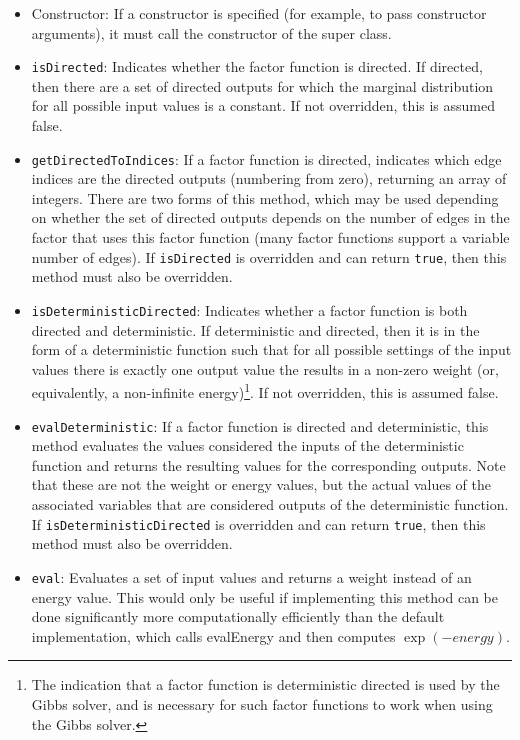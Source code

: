 \begin{itemize}
%
\item Constructor: If a constructor is specified (for example, to pass constructor arguments), it must call the constructor of the super class.
\item \texttt{isDirected}: Indicates whether the factor function is directed.  If directed, then there are a set of directed outputs for which the marginal distribution for all possible input values is a constant.  If not overridden, this is assumed false.
%
\item \texttt{getDirectedToIndices}: If a factor function is directed, indicates which edge indices are the directed outputs (numbering from zero), returning an array of integers.  There are two forms of this method, which may be used depending on whether the set of directed outputs depends on the number of edges in the factor that uses this factor function (many factor functions support a variable number of edges).  If \texttt{isDirected} is overridden and can return \texttt{true}, then this method must also be overridden.
%
\item \texttt{isDeterministicDirected}: Indicates whether a factor function is both directed and deterministic.  If deterministic and directed, then it is in the form of a deterministic function such that for all possible settings of the input values there is exactly one output value the results in a non-zero weight (or, equivalently, a non-infinite energy)\footnote{The indication that a factor function is deterministic directed is used by the Gibbs solver, and is necessary for such factor functions to work when using the Gibbs solver.}.  If not overridden, this is assumed false.
%
\item \texttt{evalDeterministic}: If a factor function is directed and deterministic, this method evaluates the values considered the inputs of the deterministic function and returns the resulting values for the corresponding outputs.  Note that these are not the weight or energy values, but the actual values of the associated variables that are considered outputs of the deterministic function.  If \texttt{isDeterministicDirected} is overridden and can return \texttt{true}, then this method must also be overridden.
%
\item \texttt{eval}: Evaluates a set of input values and returns a weight instead of an energy value.  This would only be useful if implementing this method can be done significantly more computationally efficiently than the default implementation, which calls evalEnergy and then computes $\exp(-energy)$.
%
\end{itemize}

